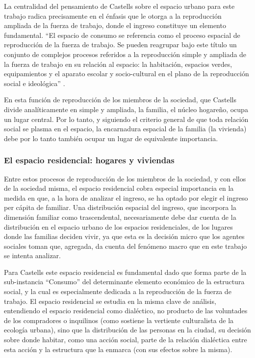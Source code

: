 	La centralidad del pensamiento de Castells sobre el espacio urbano para este trabajo radica precisamente en el énfasis que le otorga a la reproducción ampliada de la fuerza de trabajo, donde el ingreso constituye un elemento fundamental. “El espacio de consumo se referencia como el proceso espacial de reproducción de la fuerza de trabajo. Se pueden reagrupar bajo este título un conjunto de complejos procesos referidos a la reproducción simple y ampliada de la fuerza de trabajo en su relación al espacio: la habitación, espacios verdes, equipamientos y el aparato escolar y socio-cultural en el plano de la reproducción social e ideológica” \cite[p.~176]{castells}.
	
	En esta función de reproducción de los miembros de la sociedad, que Castells divide analíticamente en simple y ampliada, la familia, el núcleo hogareño, ocupa un lugar central. Por lo tanto, y siguiendo el criterio general de que toda relación social se plasma en el espacio, la encarnadura espacial de la familia (la vivienda) debe por lo tanto también ocupar un lugar de equivalente importancia.
	
	
	
	
	
	\subsubsection{El espacio residencial: hogares y viviendas}
	
	Entre estos procesos de reproducción de los miembros de la sociedad, y con ellos de la sociedad misma, el espacio residencial cobra especial importancia en la medida en que, a la hora de analizar el ingreso, se ha optado por elegir el ingreso per cápita de familiar. Una distribución espacial del ingreso, que incorpora la dimensión familiar como trascendental, necesariamente debe dar cuenta de la distribución en el espacio urbano de los espacios residenciales, de los lugares donde las familias deciden vivir, ya que esta es la decisión micro que los agentes sociales toman que, agregada, da cuenta del fenómeno macro que en este trabajo se intenta analizar.
	
	Para Castells este espacio residencial es fundamental dado que forma parte de la sub-instancia “Consumo” del determinante elemento económico de la estructura social, y la cual es especialmente dedicada a la reproducción de la fuerza de trabajo. El espacio residencial se estudia en la misma clave de análisis, entendiendo el espacio residencial como dialéctico, no producto de las voluntades de los compradores o inquilinos (como sostiene la vertiente culturalista de la ecología urbana), sino que la distribución de las personas en la ciudad, su decisión sobre donde habitar, como una acción social, parte de la relación dialéctica entre esta acción y la estructura que la enmarca (con sus efectos sobre la misma).
	
